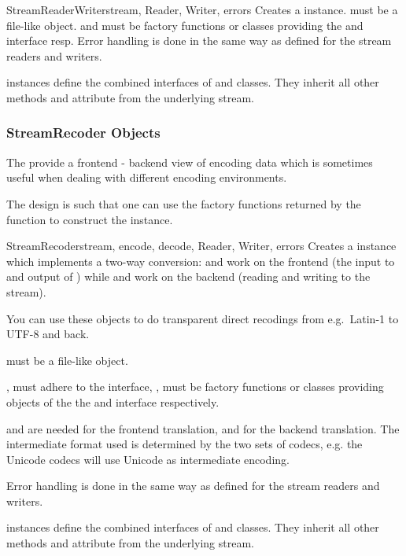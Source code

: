 \begin{classdesc}{StreamReaderWriter}{stream, Reader, Writer, errors}
  Creates a  instance.
   must be a file-like object.
   and  must be factory functions or classes
  providing the  and  interface
  resp.
  Error handling is done in the same way as defined for the
  stream readers and writers.
\end{classdesc}

 instances define the combined interfaces of
 and  classes. They inherit
all other methods and attribute from the underlying stream.


\subsubsection{StreamRecoder Objects \label{stream-recoder-objects}}

The  provide a frontend - backend view of
encoding data which is sometimes useful when dealing with different
encoding environments.

The design is such that one can use the factory functions returned by
the  function to construct the instance.

\begin{classdesc}{StreamRecoder}{stream, encode, decode,
                                 Reader, Writer, errors}
  Creates a  instance which implements a two-way
  conversion:  and  work on the frontend (the
  input to  and output of ) while
   and  work on the backend (reading and
  writing to the stream).

  You can use these objects to do transparent direct recodings from
  e.g.\ Latin-1 to UTF-8 and back.

   must be a file-like object.

  ,  must adhere to the 
  interface, ,  must be factory functions or
  classes providing objects of the the  and
   interface respectively.

   and  are needed for the frontend
  translation,  and  for the backend
  translation.  The intermediate format used is determined by the two
  sets of codecs, e.g. the Unicode codecs will use Unicode as
  intermediate encoding.

  Error handling is done in the same way as defined for the
  stream readers and writers.
\end{classdesc}

 instances define the combined interfaces of
 and  classes. They inherit
all other methods and attribute from the underlying stream.

